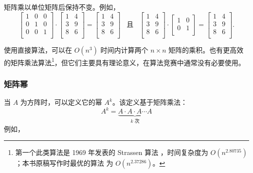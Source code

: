 \begin{samepage}
矩阵乘以单位矩阵后保持不变。例如，
\[
 \begin{bmatrix}
  1 & 0 & 0 \\
  0 & 1 & 0 \\
  0 & 0 & 1 \\
 \end{bmatrix}
\cdot
 \begin{bmatrix}
  1 & 4 \\
  3 & 9 \\
  8 & 6 \\
 \end{bmatrix}
=
 \begin{bmatrix}
  1 & 4 \\
  3 & 9 \\
  8 & 6 \\
 \end{bmatrix} \hspace{10pt} \textrm{且} \hspace{10pt}
 \begin{bmatrix}
  1 & 4 \\
  3 & 9 \\
  8 & 6 \\
 \end{bmatrix}
\cdot
 \begin{bmatrix}
  1 & 0 \\
  0 & 1 \\
 \end{bmatrix}
=
 \begin{bmatrix}
  1 & 4 \\
  3 & 9 \\
  8 & 6 \\
 \end{bmatrix}.
\]
\end{samepage}

使用直接算法，可以在 $O(n^3)$ 时间内计算两个 $n \times n$ 矩阵的乘积。也有更高效的矩阵乘法算法\footnote{第一个此类算法是 1969 年发表的 Strassen 算法 \cite{str69}，时间复杂度为 $O(n^{2.80735})$；本书原稿写作时最优的算法 \cite{gal14} 为 $O(n^{2.37286})$。}，但它们主要具有理论意义，在算法竞赛中通常没有必要使用。


\subsubsection{矩阵幂}


当 $A$ 为方阵时，可以定义它的幂 $A^k$。该定义基于矩阵乘法：
\[ A^k = \underbrace{A \cdot A \cdot A \cdots A}_{\textrm{$k$ 次}} \]
例如，

